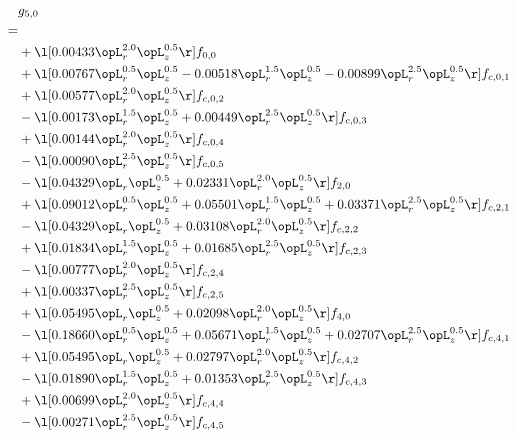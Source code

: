 \begin{alignat}{2} 
\label{eq:g_50_0} 
& g_{5,0} \nonumber \\ 
 = \\ 
& + \l[  0.00433 \opL_r^{2.0} \opL_z^{0.5}  \r] f_{0,0} \nonumber \\ 
& + \l[  0.00767 \opL_r^{0.5} \opL_z^{0.5}   -0.00518 \opL_r^{1.5} \opL_z^{0.5}   -0.00899 \opL_r^{2.5} \opL_z^{0.5}  \r] f_{c,0,1} \nonumber \\ 
& + \l[  0.00577 \opL_r^{2.0} \opL_z^{0.5}  \r] f_{c,0,2} \nonumber \\ 
& - \l[  0.00173 \opL_r^{1.5} \opL_z^{0.5} +  0.00449 \opL_r^{2.5} \opL_z^{0.5}  \r] f_{c,0,3} \nonumber \\ 
& + \l[  0.00144 \opL_r^{2.0} \opL_z^{0.5}  \r] f_{c,0,4} \nonumber \\ 
& - \l[  0.00090 \opL_r^{2.5} \opL_z^{0.5}  \r] f_{c,0,5} \nonumber \\ 
& - \l[  0.04329 \opL_r \opL_z^{0.5} +  0.02331 \opL_r^{2.0} \opL_z^{0.5}  \r] f_{2,0} \nonumber \\ 
& + \l[  0.09012 \opL_r^{0.5} \opL_z^{0.5} +  0.05501 \opL_r^{1.5} \opL_z^{0.5} +  0.03371 \opL_r^{2.5} \opL_z^{0.5}  \r] f_{c,2,1} \nonumber \\ 
& - \l[  0.04329 \opL_r \opL_z^{0.5} +  0.03108 \opL_r^{2.0} \opL_z^{0.5}  \r] f_{c,2,2} \nonumber \\ 
& + \l[  0.01834 \opL_r^{1.5} \opL_z^{0.5} +  0.01685 \opL_r^{2.5} \opL_z^{0.5}  \r] f_{c,2,3} \nonumber \\ 
& - \l[  0.00777 \opL_r^{2.0} \opL_z^{0.5}  \r] f_{c,2,4} \nonumber \\ 
& + \l[  0.00337 \opL_r^{2.5} \opL_z^{0.5}  \r] f_{c,2,5} \nonumber \\ 
& + \l[  0.05495 \opL_r \opL_z^{0.5} +  0.02098 \opL_r^{2.0} \opL_z^{0.5}  \r] f_{4,0} \nonumber \\ 
& - \l[  0.18660 \opL_r^{0.5} \opL_z^{0.5} +  0.05671 \opL_r^{1.5} \opL_z^{0.5} +  0.02707 \opL_r^{2.5} \opL_z^{0.5}  \r] f_{c,4,1} \nonumber \\ 
& + \l[  0.05495 \opL_r \opL_z^{0.5} +  0.02797 \opL_r^{2.0} \opL_z^{0.5}  \r] f_{c,4,2} \nonumber \\ 
& - \l[  0.01890 \opL_r^{1.5} \opL_z^{0.5} +  0.01353 \opL_r^{2.5} \opL_z^{0.5}  \r] f_{c,4,3} \nonumber \\ 
& + \l[  0.00699 \opL_r^{2.0} \opL_z^{0.5}  \r] f_{c,4,4} \nonumber \\ 
& - \l[  0.00271 \opL_r^{2.5} \opL_z^{0.5}  \r] f_{c,4,5} \nonumber \\ 
\end{alignat} 


